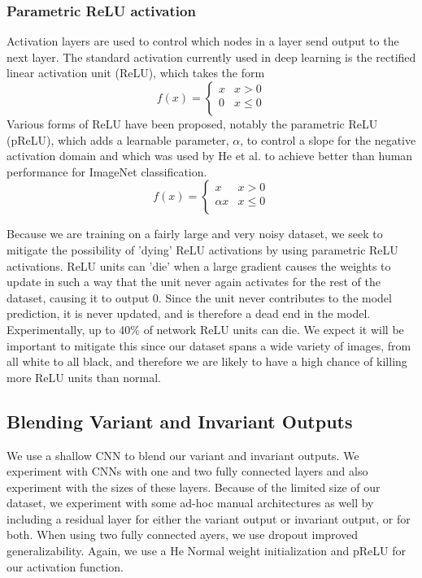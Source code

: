 \subsubsection{Parametric ReLU activation}
Activation layers are used to control which nodes in a layer send output to the next layer. The standard activation currently used in deep learning is the rectified linear activation unit (ReLU), which takes the form
\begin{equation}
	f(x) = \begin{cases}
	   x & x > 0 \\
	   0 & x\leq 0 \\
     \end{cases}
\end{equation}
Various forms of ReLU have been proposed, notably the parametric ReLU (pReLU), which adds a learnable parameter, $\alpha$, to control a slope for the negative activation domain and which was used by He et al. to achieve better than human performance for ImageNet classification.\cite{he2016deep}
\begin{equation}
	f(x) = \begin{cases}
	   x & x > 0 \\
	   \alpha x & x \leq 0 \\
     \end{cases}
\end{equation} 

Because we are training on a fairly large and very noisy dataset, we seek to mitigate the possibility of 'dying' ReLU activations by using parametric ReLU activations. ReLU units can 'die' when a large gradient causes the weights to update in such a way that the unit never again activates for the rest of the dataset, causing it to output 0. Since the unit never contributes to the model prediction, it is never updated, and is therefore a dead end in the model. Experimentally, up to 40\% of network ReLU units can die. We expect it will be important to mitigate this since our dataset spans a wide variety of images, from all white to all black, and therefore we are likely to have a high chance of killing more ReLU units than normal.

\subsection{Blending Variant and Invariant Outputs}
We use a shallow CNN to blend our variant and invariant outputs. We experiment with CNNs with one and two fully connected layers and also experiment with the sizes of these layers. Because of the limited size of our dataset, we experiment with some ad-hoc manual architectures as well by including a residual layer for either the variant output or invariant output, or for both. When using two fully connected ayers, we use dropout improved generalizability. Again, we use a He Normal weight initialization and pReLU for our activation function.

